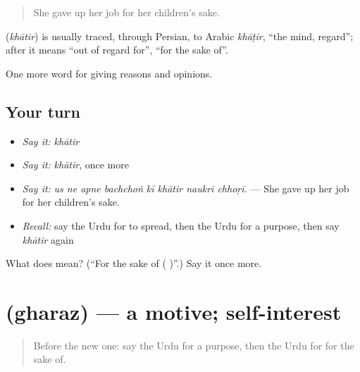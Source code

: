 \begin{quote}
She gave up her job for her children's sake.
\end{quote}

\begin{cousinweb}
\textbf{} (\emph{khātir}) is usually traced, through Persian, to Arabic \emph{khāṭir}, \textquotedblleft{}the mind, regard\textquotedblright{}; after \textbf{} it means \textquotedblleft{}out of regard for\textquotedblright{}, \textquotedblleft{}for the sake of\textquotedblright{}.
\end{cousinweb}

\begin{grammarlens}[title={What you've built}]
One more word for giving reasons and opinions.
\end{grammarlens}

\subsection*{Your turn}
\begin{itemize}
\raggedright
  \item \emph{Say it:} \emph{khātir}
  \item \emph{Say it:} \emph{khātir}, once more
  \item \emph{Say it:} \emph{us ne apne bachchoṅ kī khātir naukrī chhoṛī.} — She gave up her job for her children's sake.
  \item \emph{Recall:} say the Urdu for to spread, then the Urdu for a purpose, then say \emph{khātir} again
\end{itemize}

\begin{tcolorbox}[breakable,colback=teal!4,colframe=teal!35!black,title={Before you move on}]
What does  mean? (\textquotedblleft{}For the sake of ( )\textquotedblright{}.) Say it once more.
\end{tcolorbox}
\section[\texorpdfstring{\ur{غرض} (gharaz)}{غرض (gharaz)}]{ (gharaz) — a motive; self-interest}

\label{lesson:UR-C333-gharaz}



\begin{quote}
Before the new one: say the Urdu for a purpose, then the Urdu for for the sake of.
\end{quote}

